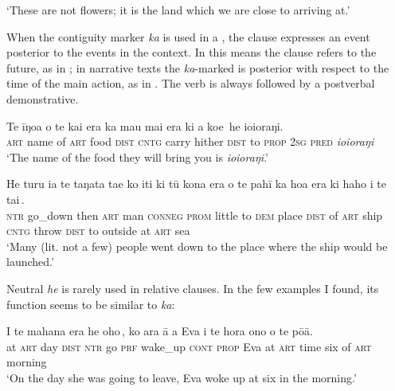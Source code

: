 \glt 
‘These are not flowers; it is the land which we are close to arriving at.’ \textstyleExampleref{[R210.197]} 
\z

When the contiguity marker \textit{ka} is used in a , the clause expresses an event posterior to the events in the context. In  this means the clause refers to the future, as in ; in narrative texts the \textit{ka}{}-marked  is posterior with respect to the time of the main action, as in . The verb is always followed by a postverbal demonstrative.

\ea\label{ex:11.117}
\gll Te {\ꞌ}īŋoa o te kai era {\ob}ka ma{\ꞌ}u mai era ki a koe\,{\cb} he ioioraŋi. \\
\textsc{art} name of \textsc{art} food \textsc{dist} {\db}\textsc{cntg} carry hither \textsc{dist} to \textsc{prop} \textsc{2sg} \textsc{pred} \textit{ioioraŋi} \\

\glt 
‘The name of the food they will bring you is \textit{ioioraŋi}.’ \textstyleExampleref{[R310.060]} 
\z

\ea\label{ex:11.118}
\gll He turu ia te taŋata ta{\ꞌ}e ko {\ꞌ}iti ki tū kona era o te pahī {\ob}ka hoa era ki haho i te tai\,{\cb}.\\
\textsc{ntr} go\_down then \textsc{art} man \textsc{conneg} \textsc{prom} little to \textsc{dem} place \textsc{dist} of \textsc{art} ship  {\db}\textsc{cntg} throw \textsc{dist} to outside at \textsc{art} sea\\

\glt 
‘Many (lit. not a few) people went down to the place where the ship would be launched.’ \textstyleExampleref{[R250.211]} 
\z

Neutral \textit{he} is rarely used in relative clauses. In the few examples I found, its function seems to be similar to \textit{ka}:

\ea\label{ex:11.119}
\gll {\ꞌ}I te mahana era {\ob}he oho\,{\cb}, ko {\ꞌ}ara {\ꞌ}ā a Eva {\ꞌ}i te hora ono  o te pō{\ꞌ}ā.\\
at \textsc{art} day \textsc{dist} {\db}\textsc{ntr} go \textsc{prf} wake\_up \textsc{cont} \textsc{prop} Eva at \textsc{art} time six  of \textsc{art} morning\\

\glt 
‘On the day she was going to leave, Eva woke up at six in the morning.’ \textstyleExampleref{[R210.028]} 
\z

